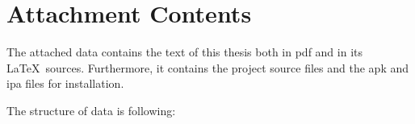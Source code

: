 \chapter{Attachment Contents}

The attached data contains the text of this thesis both in pdf and in its \LaTeX \ sources. Furthermore, it contains the project source files and the apk and ipa files for installation.

The structure of data is following:


